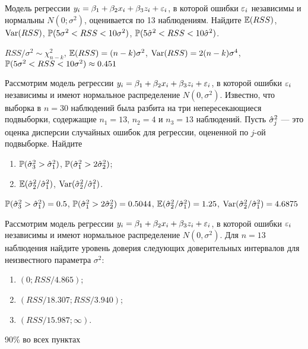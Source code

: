 \begin{problem}
Модель регрессии $y_i = \beta_1 + \beta_2 x_i + \beta_3 z_i + \e_i$, в которой ошибки
$\e_i$ независимы и нормальны $N(0;\sigma^2)$, оценивается по 13 наблюдениям. Найдите $\E(RSS)$, $\Var(RSS)$, $\P(5\sigma^2<RSS<10\sigma^2)$, $\P(5\hs^2<RSS<10\hs^2)$.


\begin{sol}
$RSS/\sigma^2\sim\chi^2_{n-k}$, $\E(RSS)=(n-k)\sigma^2$, $\Var(RSS)=2(n-k)\sigma^4$, $\P(5\sigma^2<RSS<10\sigma^2)\approx 0.451$
\end{sol}
\end{problem}



\begin{problem}
Рассмотрим модель регрессии $y_i=\beta_1+\beta_2 x_i + \beta_3 z_i+\e_i$, в которой
ошибки $\e_i$ независимы и имеют нормальное распределение $N(0,\sigma^2)$. Известно, что выборка в $n = 30$
наблюдений была разбита на три непересекающиеся подвыборки, содержащие $n_1 = 13$, $n_2 = 4$ и $n_3 = 13$ наблюдений. Пусть $\hs_{j}^2$ — это оценка дисперсии случайных ошибок для
регрессии, оцененной по $j$-ой подвыборке. Найдите
\begin{enumerate}
\item  $\P(\hs_3^2>\hs_1^2)$, $\P(\hs_1^2>2\hs_2^2)$;
\item $\E(\hs_2^2/\hs_1^2)$, $\Var(\hs_2^2/\hs_1^2)$.
\end{enumerate}


\begin{sol}
$\P(\hs_3^2>\hs_1^2)=0.5$, $\P(\hs_1^2>2\hs_2^2)=0.5044$, $\E(\hs_2^2/\hs_1^2)=1.25$, $\Var(\hs_2^2/\hs_1^2)=4.6875$
 \end{sol}
\end{problem}


\begin{problem}
Рассмотрим модель регрессии $y_i=\beta_1+\beta_2 x_i + \beta_3 z_i+\e_i$, в которой
ошибки $\e_i$ независимы и имеют нормальное распределение $N(0,\sigma^2)$. Для $n = 13$ наблюдения найдите уровень
доверия следующих доверительных интервалов для неизвестного параметра $\sigma^2$:
\begin{enumerate}
\item $(0;RSS/4.865)$;
\item $(RSS/18.307;RSS/3.940)$;
\item $(RSS/15.987;\infty)$.
\end{enumerate}


\begin{sol}
90\% во всех пунктах
\end{sol}
\end{problem}





